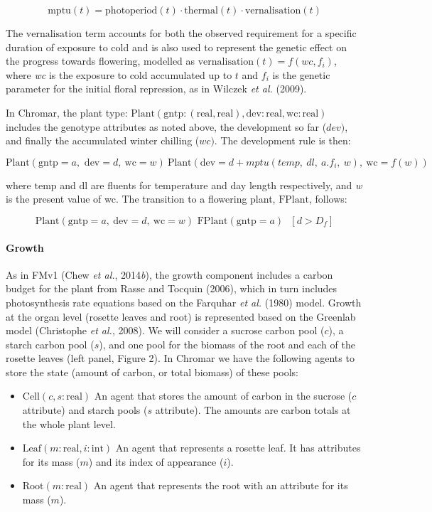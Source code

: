 \documentclass[phd]{infthesis}
\begin{document}
\[\text{mptu}(t) = \text{photoperiod}(t) \cdot \text{thermal}(t) \cdot \text{vernalisation}(t)\]

The \(\text{vernalisation}\) term accounts for both the observed
requirement for a specific duration of exposure to cold and is also used
to represent the genetic effect on the progress towards flowering,
modelled as \(\text{vernalisation}(t) = f(wc,f_{i})\), where \emph{wc}
is the exposure to cold accumulated up to \(t\) and \(f_{i}\) is the
genetic parameter for the initial floral repression, as in Wilczek
\emph{et al.} (2009).

In Chromar, the plant type:
\(\text{Plant}(\text{gntp}:(\text{real},\text{real}),\text{dev}:\text{real},\text{wc}:\text{real})\)
includes the genotype attributes as noted above, the development so far
(\(dev)\), and finally the accumulated winter chilling (\(wc)\). The
development rule is then:

\[{\text{Plant}\left( \text{gntp} = a,\text{\ dev} = d,\ \text{wc} = w \right)\ 
}{\text{Plant}(\text{dev} = d + mptu\left( temp,\ dl,\ a.f_{i},\ w \right),\ \text{wc} = f\left( w \right))}\]

where \(\text{temp}\) and \(\text{dl}\) are fluents for temperature and
day length respectively, and \emph{w} is the present value of wc. The
transition to a flowering plant, \(\text{FPlant}\), follows:

\[\text{Plant}\left( \text{gntp} = a,\ \text{dev} = d,\ \text{wc} = w \right)\text{\ FPlant}\left( \text{gntp} = a \right)\text{\ \ }\left\lbrack d > D_{f} \right\rbrack\]

\paragraph{Growth}
\label{growth}

As in FMv1 (Chew \emph{et al.}, 2014\emph{b}), the growth component
includes a carbon budget for the plant from Rasse and Tocquin (2006),
which in turn includes photosynthesis rate equations based on the
Farquhar \emph{et al.} (1980) model. Growth at the organ level (rosette
leaves and root) is represented based on the Greenlab model (Christophe
\emph{et al.}, 2008). We will consider a sucrose carbon pool (\(c\)), a
starch carbon pool (\(s\)), and one pool for the biomass of the root and
each of the rosette leaves (left panel, ­­­Figure 2). In Chromar we have
the following agents to store the state (amount of carbon, or total
biomass) of these pools:

\begin{itemize}
\item
  \(\text{Cell}(c,s:\text{real})\) An agent that stores the amount of
  carbon in the sucrose (\(c\) attribute) and starch pools (\(s\)
  attribute). The amounts are carbon totals at the whole plant level.
\item
  \(\text{Leaf}(m:\text{real},i:\text{int})\) An agent that represents a
  rosette leaf. It has attributes for its mass (\(m\)) and its index of
  appearance (\(i\)).
\item
  \(\text{Root}(m:\text{real})\) An agent that represents the root with
  an attribute for its mass (\(m\)).
\end{itemize}
\end{document}
